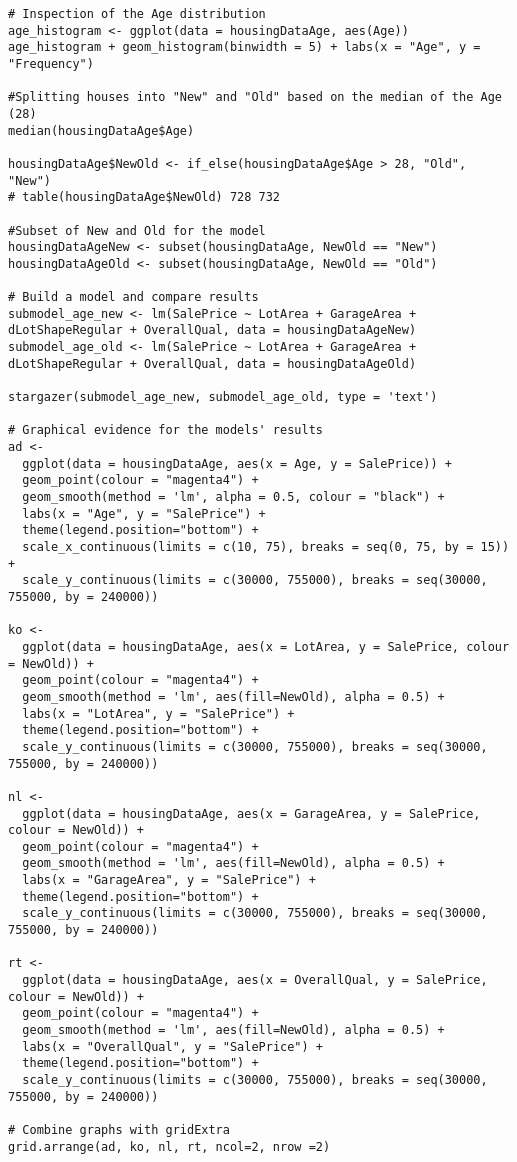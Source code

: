 \documentclass{article}
\begin{document}
\begin{tiny}
\begin{verbatim}
# Inspection of the Age distribution
age_histogram <- ggplot(data = housingDataAge, aes(Age))
age_histogram + geom_histogram(binwidth = 5) + labs(x = "Age", y = "Frequency")

#Splitting houses into "New" and "Old" based on the median of the Age (28)
median(housingDataAge$Age)

housingDataAge$NewOld <- if_else(housingDataAge$Age > 28, "Old", "New")
# table(housingDataAge$NewOld) 728 732

#Subset of New and Old for the model
housingDataAgeNew <- subset(housingDataAge, NewOld == "New")
housingDataAgeOld <- subset(housingDataAge, NewOld == "Old")

# Build a model and compare results
submodel_age_new <- lm(SalePrice ~ LotArea + GarageArea + dLotShapeRegular + OverallQual, data = housingDataAgeNew)
submodel_age_old <- lm(SalePrice ~ LotArea + GarageArea + dLotShapeRegular + OverallQual, data = housingDataAgeOld)

stargazer(submodel_age_new, submodel_age_old, type = 'text')

# Graphical evidence for the models' results
ad <- 
  ggplot(data = housingDataAge, aes(x = Age, y = SalePrice)) +
  geom_point(colour = "magenta4") +
  geom_smooth(method = 'lm', alpha = 0.5, colour = "black") +
  labs(x = "Age", y = "SalePrice") +
  theme(legend.position="bottom") +
  scale_x_continuous(limits = c(10, 75), breaks = seq(0, 75, by = 15)) +
  scale_y_continuous(limits = c(30000, 755000), breaks = seq(30000, 755000, by = 240000))

ko <- 
  ggplot(data = housingDataAge, aes(x = LotArea, y = SalePrice, colour = NewOld)) +
  geom_point(colour = "magenta4") +
  geom_smooth(method = 'lm', aes(fill=NewOld), alpha = 0.5) +
  labs(x = "LotArea", y = "SalePrice") +  
  theme(legend.position="bottom") +
  scale_y_continuous(limits = c(30000, 755000), breaks = seq(30000, 755000, by = 240000))

nl <- 
  ggplot(data = housingDataAge, aes(x = GarageArea, y = SalePrice, colour = NewOld)) +
  geom_point(colour = "magenta4") +
  geom_smooth(method = 'lm', aes(fill=NewOld), alpha = 0.5) +
  labs(x = "GarageArea", y = "SalePrice") +  
  theme(legend.position="bottom") +
  scale_y_continuous(limits = c(30000, 755000), breaks = seq(30000, 755000, by = 240000))

rt <-
  ggplot(data = housingDataAge, aes(x = OverallQual, y = SalePrice, colour = NewOld)) +
  geom_point(colour = "magenta4") +
  geom_smooth(method = 'lm', aes(fill=NewOld), alpha = 0.5) +
  labs(x = "OverallQual", y = "SalePrice") +  
  theme(legend.position="bottom") +
  scale_y_continuous(limits = c(30000, 755000), breaks = seq(30000, 755000, by = 240000))

# Combine graphs with gridExtra
grid.arrange(ad, ko, nl, rt, ncol=2, nrow =2)
\end{verbatim}
\end{tiny}
\end{document}
